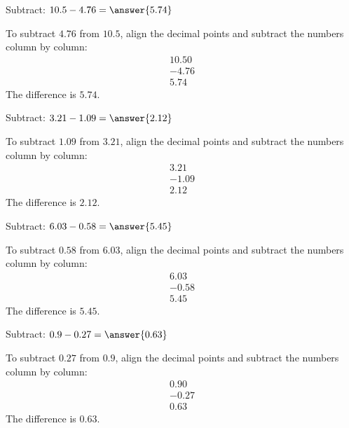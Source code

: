 \documentclass{ximera}
\begin{document}
\begin{problem}
Subtract: $10.5 - 4.76 = \answer{5.74}$
\begin{feedback}
To subtract $4.76$ from $10.5$, align the decimal points and subtract the numbers column by column:
\begin{align*}
 10.50 \\
- 4.76 \\
\hline
  5.74
\end{align*}
The difference is $5.74$.
\end{feedback}
\end{problem}

\begin{problem}
Subtract: $3.21 - 1.09 = \answer{2.12}$
\begin{feedback}
To subtract $1.09$ from $3.21$, align the decimal points and subtract the numbers column by column:
\begin{align*}
  3.21 \\
- 1.09 \\
\hline
  2.12
\end{align*}
The difference is $2.12$.
\end{feedback}
\end{problem}

\begin{problem}
Subtract: $6.03 - 0.58 = \answer{5.45}$
\begin{feedback}
To subtract $0.58$ from $6.03$, align the decimal points and subtract the numbers column by column:
\begin{align*}
  6.03 \\
- 0.58 \\
\hline
  5.45
\end{align*}
The difference is $5.45$.
\end{feedback}
\end{problem}

\begin{problem}
Subtract: $0.9 - 0.27 = \answer{0.63}$
\begin{feedback}
To subtract $0.27$ from $0.9$, align the decimal points and subtract the numbers column by column:
\begin{align*}
  0.90 \\
- 0.27 \\
\hline
  0.63
\end{align*}
The difference is $0.63$.
\end{feedback}
\end{problem}
\end{document}
